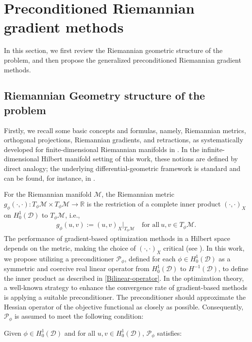 \documentclass[preprint,3p]{elsarticle}
\begin{document}
\section{Preconditioned Riemannian gradient methods}\label{Sec3}

In this section, we first review the Riemannian geometric structure of the problem, and then propose the generalized preconditioned Riemannian gradient methods.
\subsection{Riemannian Geometry structure of the problem}
{Firstly, we recall some basic concepts and formulas, namely, Riemannian metrics, orthogonal projections, Riemannian gradients, and retractions, as systematically developed for finite-dimensional Riemannian manifolds in \cite{N.B.appear}. 
In the infinite-dimensional Hilbert manifold setting of this work, these notions are defined by direct analogy; the underlying differential-geometric framework is standard and can be found, for instance, in \cite{1988Manifold, 1995Lang}.}

For the Riemannian manifold $\mathcal{M}$, the Riemannian metric $g_{\phi}(\cdot,\cdot):T_{\phi}\mathcal{M}\times T_{\phi}\mathcal{M}\to\mathbb{R}$ is the restriction of a complete inner product $(\cdot,\cdot)_X$ on $H_0^1(\mathcal{D})$ to $T_{\phi}\mathcal{M}$, i.e.,
\begin{align*}
	g_{\phi}(u,v):=(u,v)_{X}|_{{{T_{\phi}\mathcal{M}}}}\quad \text{for all}\ u,v\in T_{\phi}\mathcal{M}.
\end{align*}
The performance of gradient-based optimization methods in a Hilbert space depends on the metric, making the choice of $(\cdot,\cdot)_X$ critical (see \cite{2010Sobolev}). In this work, we propose utilizing a preconditioner $\mathcal{P}_{\phi}$, {defined for each $\phi \in H_0^1(\mathcal{D})$ as a symmetric and coercive real linear operator from $H_0^1(\mathcal{D})$ to $H^{-1}(\mathcal{D})$}, to define the inner product as described in \eqref{Bilinear-operator}. In the optimization theory, a well-known strategy to enhance the convergence rate of gradient-based methods is applying a suitable preconditioner. The preconditioner should approximate the Hessian operator of the objective functional as closely as possible. Consequently, $\mathcal{P}_{\phi}$ is assumed to meet the following condition:

\medskip

\noindent {} Given $\phi\in H_0^1(\mathcal{D})$ and for all $u,v\in H_0^1(\mathcal{D})$, $\mathcal{P}_{\phi}$ satisfies:
\end{document}
